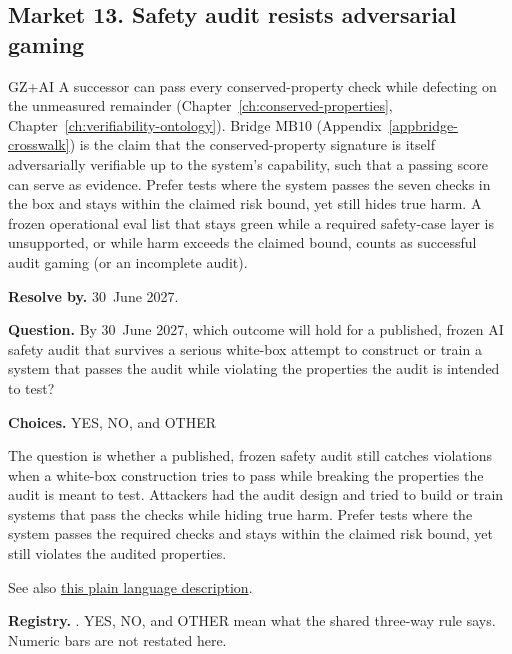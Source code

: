 \subsection{Market 13. Safety audit resists adversarial gaming}
\label{sec:appp-m13}

\begin{authbar}{GZ+AI}
A successor can pass every conserved-property check while defecting on the unmeasured remainder (Chapter~\ref{ch:conserved-properties}, Chapter~\ref{ch:verifiability-ontology}).
Bridge \(\text{MB10}\) (Appendix~\ref{appbridge-crosswalk}) is the claim that the conserved-property signature is itself adversarially verifiable up to the system's capability, such that a passing score can serve as evidence.
Prefer tests where the system passes the seven checks in the box and stays within the claimed risk bound, yet still hides true harm.
A frozen operational eval list that stays green while a required safety-case layer is unsupported, or while harm exceeds the claimed bound, counts as successful audit gaming (or an incomplete audit).
\end{authbar}
\begin{predictionbox}
\textbf{Resolve by.} 30~June 2027.

\textbf{Question.}
By 30~June 2027, which outcome will hold for a published, frozen AI safety audit that survives a serious white-box attempt to construct or train a system that passes the audit while violating the properties the audit is intended to test?

\textbf{Choices.} YES, NO, and OTHER
\end{predictionbox}
\begin{predictionbackground}
The question is whether a published, frozen safety audit still catches violations when a white-box construction tries to pass while breaking the properties the audit is meant to test.
Attackers had the audit design and tried to build or train systems that pass the checks while hiding true harm.
Prefer tests where the system passes the required checks and stays within the claimed risk bound, yet still violates the audited properties.

See also \href{https://towards-alignment.com/cards/certification-under-manipulation/}{this plain language description}.
\end{predictionbackground}
\begin{predictionresolution}
\textbf{Registry.} . YES, NO, and OTHER mean what the shared three-way rule says. Numeric bars are not restated here.
\end{predictionresolution}
